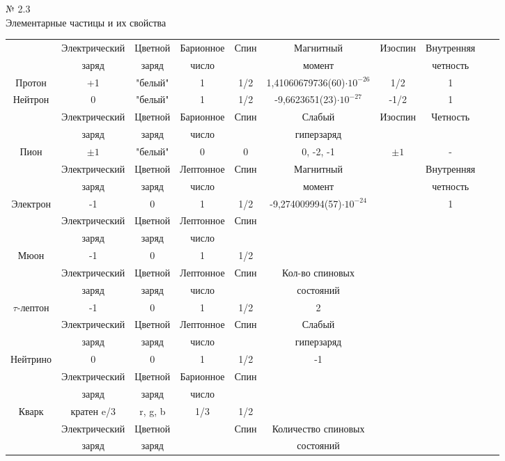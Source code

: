 \documentclass{article}
\begin{document}
\begin{center}
	№ 2.3 \\
	Элементарные частицы и их свойства \\
\end{center}
\begin{table}[h]
\begin{center}
\begin{tabular}{cccccccccc}
\hline
 & Электрический & Цветной & Барионное& Спин & Магнитный  & Изоспин & Внутренняя\\
& заряд &заряд& число & & момент  && четность\\
Протон & +1 &"белый"& 1 &  1/2 & 1,41060679736(60)$\cdot10^{-26}$  & 1/2& 1\\
Нейтрон & 0 &"белый"& 1 &  1/2 & -9,6623651(23)$\cdot10^{-27}$ & -1/2& 1\\
\hline
& Электрический &Цветной& Барионное& Спин & Слабый & Изоспин& Четность\\
& заряд &заряд& число & & гиперзаряд  \\
Пион &$\pm1$ & "белый"&0&0&0, -2, -1&$\pm1$& -
\\
\hline
& Электрический &Цветной& Лептонное & Спин & Магнитный && Внутренняя   \\
& заряд &заряд& число & & момент && четность   \\
Электрон & -1 &0& 1 & 1/2 & -9,274009994(57)$\cdot10^{-24}$ && 1
\\
\hline
& Электрический &Цветной& Лептонное & Спин  \\
& заряд &заряд& число  \\
Мюон & -1 &0& 1 & 1/2
\\
\hline
& Электрический &Цветной& Лептонное & Спин & Кол-во спиновых   \\
& заряд &заряд& число & & состояний \\
$\tau$-лептон & -1 &0& 1 & 1/2 & 2
\\
\hline
& Электрический &Цветной& Лептонное & Спин & Слабый  \\
& заряд &заряд& число & & гиперзаряд \\
Нейтрино & 0 &0& 1 & 1/2 & -1
\\
\hline
& Электрический &Цветной& Барионное & Спин  \\
& заряд &заряд& число & \\
Кварк & кратен e/3 & r, g, b & 1/3 & 1/2 
\\
\hline
& Электрический & Цветной && Спин & Количество спиновых  \\
& заряд & заряд &&& состояний\\

\end{tabular}
\end{center}
\end{table}
\end{document}
